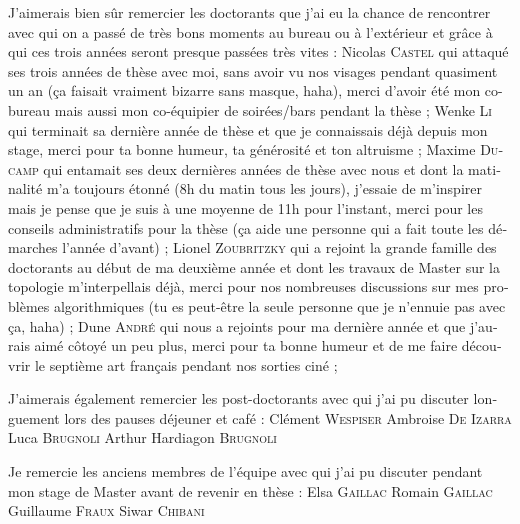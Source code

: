 \begin{otherlanguage}{french}
J'aimerais bien sûr remercier les doctorants que j'ai eu la chance de rencontrer avec qui on a passé de très bons moments au bureau ou à l'extérieur et grâce à qui ces trois années seront presque passées très vites :
Nicolas \textsc{Castel} qui attaqué ses trois années de thèse avec moi, sans avoir vu nos visages pendant quasiment un an (ça faisait vraiment bizarre sans masque, haha), merci d'avoir été mon co-bureau mais aussi mon co-équipier de soirées/bars pendant la thèse ; 
Wenke \textsc{Li} qui terminait sa dernière année de thèse et que je connaissais déjà depuis mon stage, merci pour ta bonne humeur, ta générosité et ton altruisme ;
Maxime \textsc{Ducamp} qui entamait ses deux dernières années de thèse avec nous et dont la matinalité m'a toujours étonné (8h du matin tous les jours), j'essaie de m'inspirer mais je pense que je suis à une moyenne de 11h pour l'instant, merci pour les conseils administratifs pour la thèse (ça aide une personne qui a fait toute les démarches l'année d'avant) ;
Lionel \textsc{Zoubritzky} qui a rejoint la grande famille des doctorants au début de ma deuxième année et dont les travaux de Master sur la topologie m'interpellais déjà, merci pour nos nombreuses discussions sur mes problèmes algorithmiques (tu es peut-être la seule personne que je n'ennuie pas avec ça, haha) ;
Dune \textsc{André} qui nous a rejoints pour ma dernière année et que j'aurais aimé côtoyé un peu plus, merci pour ta bonne humeur et de me faire découvrir le septième art français pendant nos sorties ciné ;

J'aimerais également remercier les post-doctorants avec qui j'ai pu discuter longuement lors des pauses déjeuner et café :
Clément \textsc{Wespiser}
Ambroise \textsc{De Izarra} 
Luca \textsc{Brugnoli} 
Arthur Hardiagon \textsc{Brugnoli} 

Je remercie les anciens membres de l'équipe avec qui j'ai pu discuter pendant mon stage de Master avant de revenir en thèse :
Elsa \textsc{Gaillac}
Romain \textsc{Gaillac}
Guillaume \textsc{Fraux}
Siwar \textsc{Chibani}




\endgroup
\clearpage

%
%
%
%
%
%
%

\end{otherlanguage}

